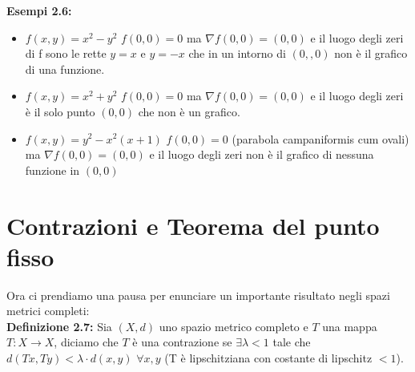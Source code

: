 \documentclass[a4paper,11pt,titlepage]{book}
\begin{document}
\textbf{Esempi 2.6:}\begin{itemize}
\item $f(x,y)=x^2-y^2$ $f(0,0)=0$ ma $\nabla f(0,0)=(0,0)$ e il luogo degli zeri di f sono le rette $y=x$ e $y=-x$ che in un intorno di $(0,,0)$ non è il grafico di una funzione.
\begin{center}
\end{center}
\item $f(x,y)=x^2+y^2$ $f(0,0)=0$ ma $\nabla f(0,0)=(0,0)$ e il luogo degli zeri è il solo punto $(0,0)$ che non è un grafico.
\item $f(x,y)=y^2-x^2(x+1)$ $f(0,0)=0$ (parabola campaniformis cum ovali) ma $\nabla f(0,0)=(0,0)$ e il luogo degli zeri non è il grafico di nessuna funzione in $(0,0)$

\begin{center}
\end{center}
\end{itemize}

\section{Contrazioni e Teorema del punto fisso}

Ora ci prendiamo una pausa per enunciare un importante risultato negli spazi metrici completi:\\

\textbf{Definizione 2.7:} Sia $(X,d)$ uno spazio metrico completo e $T$ una mappa $T:X\to X$, diciamo che $T$ è una contrazione se $\exists\lambda<1$ tale che $d(Tx,Ty)<\lambda\cdot d(x,y)$ $\forall x,y$ (T è lipschitziana con costante di lipschitz $<1$).\\
\end{document}
